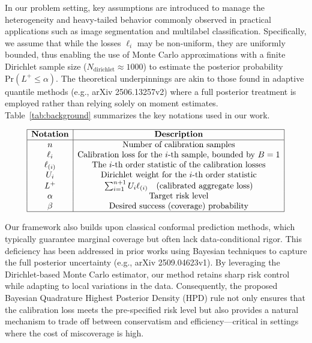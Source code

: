 \documentclass{article}
\begin{document}
In our problem setting, key assumptions are introduced to manage the heterogeneity and heavy-tailed behavior commonly observed in practical applications such as image segmentation and multilabel classification. Specifically, we assume that while the losses \(\ell_i\) may be non-uniform, they are uniformly bounded, thus enabling the use of Monte Carlo approximations with a finite Dirichlet sample size (\(N_{\text{dirichlet}} \approx 1000\)) to estimate the posterior probability \(\mathrm{Pr}(L^+ \le \alpha)\). The theoretical underpinnings are akin to those found in adaptive quantile methods (e.g., arXiv 2506.13257v2) where a full posterior treatment is employed rather than relying solely on moment estimates. Table~\ref{tab:background} summarizes the key notations used in our work.

\[
\begin{array}{|c|c|}
\hline
\textbf{Notation} & \textbf{Description} \\
\hline
n & \text{Number of calibration samples} \\
\ell_i & \text{Calibration loss for the } i\text{-th sample, bounded by } B=1 \\
\ell_{(i)} & \text{The } i\text{-th order statistic of the calibration losses} \\
U_i & \text{Dirichlet weight for the } i\text{-th order statistic} \\
L^+ & \sum_{i=1}^{n+1} U_i \ell_{(i)} \quad \text{(calibrated aggregate loss)} \\
\alpha & \text{Target risk level} \\
\beta & \text{Desired success (coverage) probability} \\
\hline
\end{array}
\]
\vspace{2mm}

Our framework also builds upon classical conformal prediction methods, which typically guarantee marginal coverage but often lack data-conditional rigor. This deficiency has been addressed in prior works using Bayesian techniques to capture the full posterior uncertainty (e.g., arXiv 2509.04623v1). By leveraging the Dirichlet-based Monte Carlo estimator, our method retains sharp risk control while adapting to local variations in the data. Consequently, the proposed Bayesian Quadrature Highest Posterior Density (HPD) rule not only ensures that the calibration loss meets the pre-specified risk level but also provides a natural mechanism to trade off between conservatism and efficiency—critical in settings where the cost of miscoverage is high.
\end{document}
